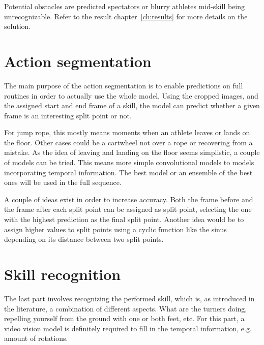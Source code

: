Potential obstacles are predicted spectators or blurry athletes mid-skill being unrecognizable. Refer to the result chapter~\ref{ch:results} for more details on the solution.

\section{Action segmentation}

The main purpose of the action segmentation is to enable predictions on full routines in order to actually use the whole model. Using the cropped images, and the assigned start and end frame of a skill, the model can predict whether a given frame is an interesting split point or not.

For jump rope, this mostly means moments when an athlete leaves or lands on the floor. Other cases could be a cartwheel not over a rope or recovering from a mistake. As the idea of leaving and landing on the floor seems simplistic, a couple of models can be tried. This means more simple convolutional models to models incorporating temporal information.
The best model or an ensemble of the best ones will be used in the full sequence.

A couple of ideas exist in order to increase accuracy. Both the frame before and the frame after each split point can be assigned as split point, selecting the one with the highest prediction as the final split point. Another idea would be to assign higher values to split points using a cyclic function like the sinus depending on its distance between two split points.

\section{Skill recognition}

The last part involves recognizing the performed skill, which is, as introduced in the literature, a combination of different aspects. What are the turners doing, repelling yourself from the ground with one or both feet, etc.
For this part, a video vision model is definitely required to fill in the temporal information, e.g. amount of rotations.




